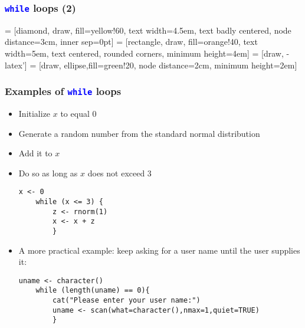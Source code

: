 \documentclass[10pt]{beamer}
\newcommand{\cc}[1]{\texttt{\textcolor{blue}{#1}}}
\theoremstyle{definition}
\begin{document}
\begin{frame}[fragile]
\frametitle{\cc{while} loops (2)}
 = [diamond, draw, fill=yellow!60, 
    text width=4.5em, text badly centered, node distance=3cm, inner sep=0pt]
 = [rectangle, draw, fill=orange!40, 
    text width=5em, text centered, rounded corners, minimum height=4em]
 = [draw, -latex']
 = [draw, ellipse,fill=green!20, node distance=2cm,
    minimum height=2em]

\begin{center}
\end{center} 
\end{frame}

\begin{frame}[fragile]
\frametitle{Examples of \cc{while} loops}
\begin{itemize}
	\item Initialize $x$ to equal 0
	\item Generate a random number from the standard normal distribution
	\item Add it to $x$
	\item Do so as long as $x$ does not exceed 3
	\begin{lstlisting}[style = rstyle, breaklines]
	x <- 0
	while (x <= 3) {
		z <- rnorm(1)
		x <- x + z
		}
	\end{lstlisting}
	\item A more practical example: keep asking for a user name until the user supplies it:
	\begin{lstlisting}[style = rstyle, breaklines]
	uname <- character()
	while (length(uname) == 0){
		cat("Please enter your user name:")
		uname <- scan(what=character(),nmax=1,quiet=TRUE)
		}
	\end{lstlisting}
\end{itemize} 
\end{frame}
\end{document}
